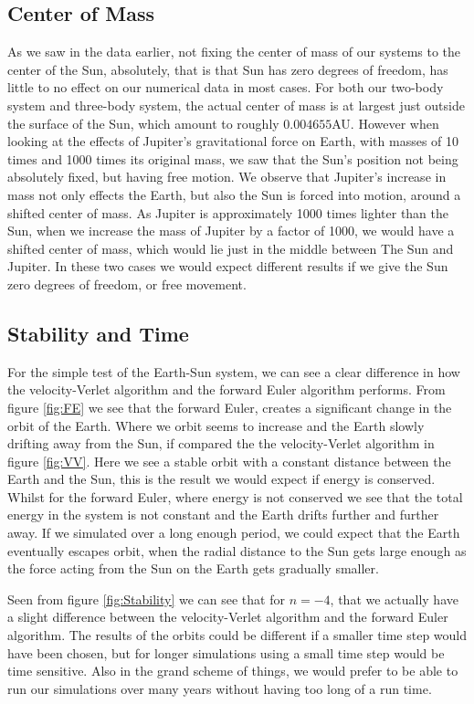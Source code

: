 \documentclass[%
reprint,
nofootinbib,
amsmath,amssymb,
aps,
]{revtex4-1}
\begin{document}
\subsection{Center of Mass} %
As we saw in the data earlier, not fixing the center of mass of our systems to the center of the Sun, absolutely, that is that Sun has zero degrees of freedom, has little to no effect on our numerical data in most cases. For both our two-body system and three-body system, the actual center of mass is at largest just outside the surface of the Sun\cite{1994A&A...282..663S}, which amount to roughly $0.004655$AU. 
However when looking at the effects of Jupiter's gravitational force on Earth, with masses of 10 times and 1000 times its original mass, we saw that the Sun's position not being absolutely fixed, but having free motion. We observe that Jupiter's increase in mass not only effects the Earth, but also the Sun is forced into motion, around a shifted center of mass. As Jupiter is approximately 1000 times lighter than the Sun, when we increase the mass of Jupiter by a factor of 1000, we would have a shifted center of mass, which would lie just in the middle between The Sun and Jupiter. 
In these two cases we would expect different results if we give the Sun zero degrees of freedom, or free movement.

\subsection{Stability and Time} %
For the simple test of the Earth-Sun system, we can see a clear difference in how the velocity-Verlet algorithm and the forward Euler algorithm performs. From figure \ref{fig:FE} we see that the forward Euler, creates a significant change in the orbit of the Earth. Where we orbit seems to increase and the Earth slowly drifting away from the Sun, if compared the the velocity-Verlet algorithm in figure \ref{fig:VV}. Here we see a stable orbit with a constant distance between the Earth and the Sun, this is the result we would expect if energy is conserved. Whilst for the forward Euler, where energy is not conserved we see that the total energy in the system is not constant and the Earth drifts further and further away. If we simulated over a long enough period, we could expect that the Earth eventually escapes orbit, when the radial distance to the Sun gets large enough as the force acting from the Sun on the Earth gets gradually smaller. 

Seen from figure \ref{fig:Stability} we can see that for $n = -4$, that we actually have a slight difference between the velocity-Verlet algorithm and the forward Euler algorithm. The results of the orbits could be different if a smaller time step would have been chosen, but for longer simulations using a small time step would be time sensitive. Also in the grand scheme of things, we would prefer to be able to run our simulations over many years without having too long of a run time. 
\end{document}
